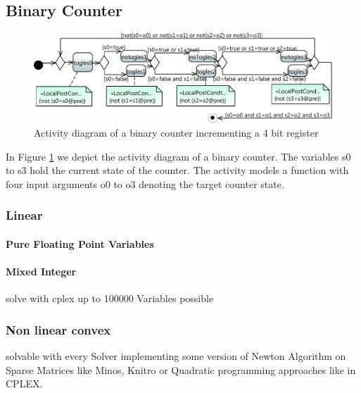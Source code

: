 \subsection{Binary Counter}
\begin{figure}
\includegraphics[width=\textwidth]{./pics/BinaryCounter.pdf}
\caption{Activity diagram of a binary counter incrementing a 4 bit register}
\label{fig:BinaryCounter}
\end{figure}
\begin{figure}
%
\end{figure}
In Figure \ref{fig:BinaryCounter} we depict the activity diagram of a binary counter. The variables s0 to s3 hold the current state of the counter. The activity models a function with four input arguments o0 to o3 denoting the target counter state.
\subsubsection{Linear}
\paragraph{Pure Floating Point Variables}
\paragraph{Mixed Integer}
solve with cplex up to 100000 Variables possible
\subsubsection{Non linear convex}
solvable with every Solver implementing some version of Newton Algorithm on Sparse Matrices like Minos, Knitro or Quadratic programming approaches like in CPLEX.
